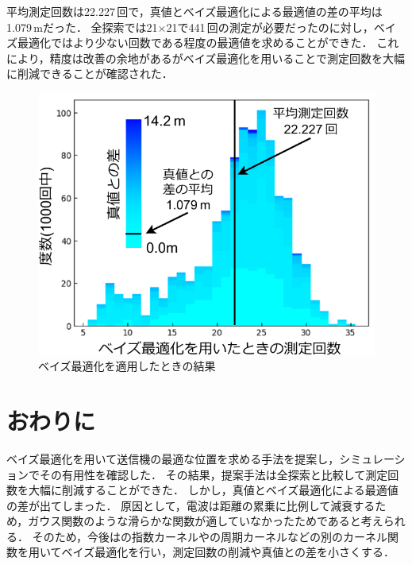 \documentclass[twocolumn]{ltjarticle}
\begin{document}
平均測定回数は22.227\(\,\)回で，真値とベイズ最適化による最適値の差の平均は1.079\(\,\)mだった．
全探索では21\(\times\)21で441\(\,\)回の測定が必要だったのに対し，ベイズ最適化ではより少ない回数である程度の最適値を求めることができた．
これにより，精度は改善の余地があるがベイズ最適化を用いることで測定回数を大幅に削減できることが確認された．
\setlength\intextsep{3pt}
\setlength\textfloatsep{3pt}
\begin{figure}[h]
	\centering
	\includegraphics[width=0.71\linewidth]{./figures/material_5_result.pdf}
	\vspace*{-0.3cm}
	\caption{ベイズ最適化を適用したときの結果} \label{fig:result}
\end{figure}
\section{おわりに}

ベイズ最適化を用いて送信機の最適な位置を求める手法を提案し，シミュレーションでその有用性を確認した．
その結果，提案手法は全探索と比較して測定回数を大幅に削減することができた．
しかし，真値とベイズ最適化による最適値の差が出てしまった．
原因として，電波は距離の累乗に比例して減衰するため，ガウス関数のような滑らかな関数が適していなかったためであると考えられる．
そのため，今後はの指数カーネルやの周期カーネルなどの別のカーネル関数を用いてベイズ最適化を行い，測定回数の削減や真値との差を小さくする．

\printbibliography[title=参考文献]
\end{document}
